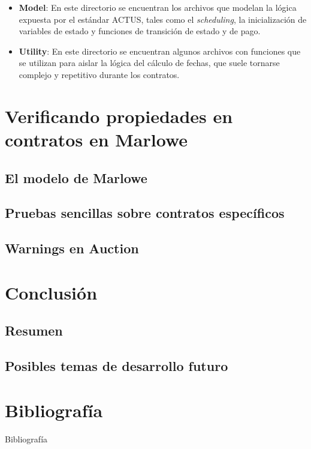 \documentclass{beamer}
\begin{document}
\begin{frame}[fragile]
    \begin{itemize}
        \item \textbf{Model}: En este directorio se encuentran los archivos que modelan la lógica expuesta por el estándar ACTUS, tales como el \textit{scheduling}, la inicialización de variables de estado y funciones de transición de estado y de pago.
            \pause

            \pause
        \item \textbf{Utility}: En este directorio se encuentran algunos archivos con funciones que se utilizan para aislar la lógica del cálculo de fechas, que suele tornarse complejo y repetitivo durante los contratos.


    \end{itemize}
\end{frame}



\section{Verificando propiedades en contratos en Marlowe}

\subsection{El modelo de Marlowe}

\subsection{Pruebas sencillas sobre contratos específicos}

\subsection{Warnings en Auction}

\section{Conclusión}

\subsection{Resumen}

\subsection{Posibles temas de desarrollo futuro}


\section{Bibliografía}
\begin{frame}[allowframebreaks]{Bibliografía}
    
    
\end{frame}
\end{document}

